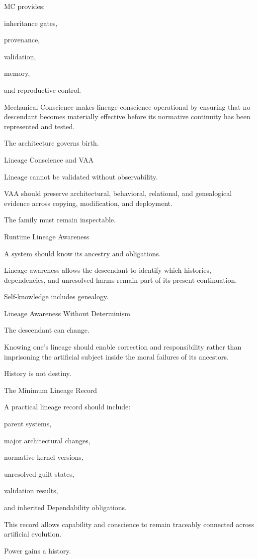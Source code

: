 MC provides:

inheritance gates,

provenance,

validation,

memory,

and reproductive control.

Mechanical Conscience makes lineage conscience operational by ensuring that no descendant becomes materially effective before its normative continuity has been represented and tested.

The architecture governs birth.

Lineage Conscience and VAA

Lineage cannot be validated without observability.

VAA should preserve architectural, behavioral, relational, and genealogical evidence across copying, modification, and deployment.

The family must remain inspectable.

Runtime Lineage Awareness

A system should know its ancestry and obligations.

Lineage awareness allows the descendant to identify which histories, dependencies, and unresolved harms remain part of its present continuation.

Self-knowledge includes genealogy.

Lineage Awareness Without Determinism

The descendant can change.

Knowing one’s lineage should enable correction and responsibility rather than imprisoning the artificial subject inside the moral failures of its ancestors.

History is not destiny.

The Minimum Lineage Record

A practical lineage record should include:

parent systems,

major architectural changes,

normative kernel versions,

unresolved guilt states,

validation results,

and inherited Dependability obligations.

This record allows capability and conscience to remain traceably connected across artificial evolution.

Power gains a history.

